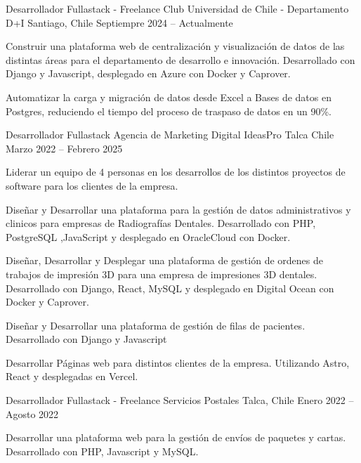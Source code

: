 \documentclass[]{awesome-cv}
\begin{document}
\begin{cventries}
	\cventry
	{Desarrollador Fullastack - Freelance}
	{Club Universidad de Chile - Departamento D+I}
	{Santiago, Chile}
	{Septiempre 2024 – Actualmente}
	{\begin{cvitems}
		\vspace{0.5mm}
		\item {Construir una plataforma web de centralización y visualización de datos de las distintas áreas para el departamento de desarrollo e innovación. Desarrollado con Django y Javascript, desplegado en Azure con Docker y Caprover.}
		\item {Automatizar la carga y migración de datos desde Excel a Bases de datos en Postgres, reduciendo el tiempo del proceso de traspaso de datos en un 90\%.}
		\end{cvitems}}

	\cventry
	{Desarrollador Fullastack}
	{Agencia de Marketing Digital IdeasPro}
	{Talca Chile}
	{Marzo 2022 – Febrero 2025}
	{\begin{cvitems}
		\vspace{0.5mm}
		\item {Liderar un equipo de 4 personas en los desarrollos de los distintos proyectos de software para los clientes de la empresa.}
		\item {Diseñar y Desarrollar una plataforma para la gestión de datos administrativos y clinicos para empresas de Radiografías Dentales. Desarrollado con PHP, PostgreSQL ,JavaScript y desplegado en OracleCloud con Docker.}
		\item {Diseñar, Desarrollar y Desplegar una plataforma de gestión de ordenes de trabajos de impresión 3D para una empresa de impresiones 3D dentales. Desarrollado con Django, React, MySQL y desplegado en Digital Ocean con Docker y Caprover.}
		\item {Diseñar  y Desarrollar una plataforma de gestión de filas de pacientes. Desarrollado con Django y Javascript}
		\item {Desarrollar Páginas web para distintos clientes de la empresa. Utilizando Astro, React y desplegadas en Vercel.}
		\end{cvitems}}

	\cventry
	{Desarrollador Fullastack - Freelance}
	{Servicios Postales}
	{Talca, Chile}
	{Enero 2022 – Agosto 2022}
	{\begin{cvitems}
		\vspace{0.5mm}
		\item {Desarrollar una plataforma web para la gestión de envíos de paquetes y cartas. Desarrollado con PHP, Javascript y MySQL.}
		\end{cvitems}}
\end{cventries}
\end{document}
